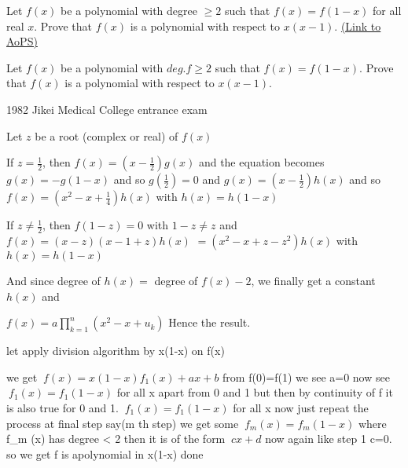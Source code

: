 \begin{problem}
	Let $f(x)$ be a polynomial with degree $\geq 2$ such that $f(x)=f(1-x)$ for all real $x$.
Prove that $f(x)$ is a polynomial with respect to $x(x-1)$.
	\flushright \href{https://artofproblemsolving.com/community/c6h368328}{(Link to AoPS)}
\end{problem}



\begin{solution}
	\begin{tcolorbox}Let $f(x)$ be a polynomial with $deg.f\geq 2$ such that $f(x)=f(1-x).$
Prove that $f(x)$ is a polynomial with respect to $x(x-1).$

\begin{italicized}1982 Jikei Medical College entrance exam\end{italicized}\end{tcolorbox}
Let $z$ be a root (complex or real) of $f(x)$

If $z=\frac 12$, then $f(x)=(x-\frac 12)g(x)$ and the equation becomes $g(x)=-g(1-x)$ and so $g(\frac 12)=0$ and $g(x)=(x-\frac 12)h(x)$ and so $f(x)=(x^2-x+\frac 14)h(x)$ with $h(x)=h(1-x)$

If $z\ne \frac 12$, then $f(1-z)=0$ with $1-z\ne z$ and $f(x)=(x-z)(x-1+z)h(x)$ $=(x^2-x+z-z^2)h(x)$ with $h(x)=h(1-x)$

And since degree of $h(x)=$ degree of $f(x) - 2$, we finally get a constant $h(x)$ and 

$\boxed{f(x)=a\prod_{k=1}^n(x^2-x+u_k)}$
Hence the result.
\end{solution}



\begin{solution}
	let apply division algorithm by x(1-x) on f(x)

we get $ \ f(x)=x(1-x)f_{1}(x)+ax+b $
from f(0)=f(1) we see a=0
now see $ \ f_{1}(x)=f_{1}(1-x) $ for all x apart from 0 and 1
but then by continuity of f it is also true for 0 and 1.
$ \ f_{1}(x)=f_{1}(1-x) $ for all x
now just repeat the process
at final step say(m th step) we get some $ \ f_{m}(x)=f_{m}(1-x) $
where f_{m} (x) has degree < 2
then it is of the form $ \ cx+d $ now again like step 1 c=0.
so we get 
f is apolynomial in x(1-x)
done
\end{solution}




